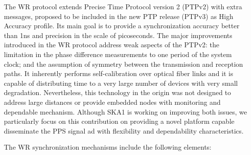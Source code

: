 The WR protocol extends Precise Time Protocol version 2 (PTPv2) with extra messages, proposed to be included in the new PTP release (PTPv3) as High Accuracy profile. Its main goal is to provide a synchronization accuracy better than 1ns and precision in the scale of picoseconds. The major improvements introduced in the WR protocol address weak aspects of the PTPv2: the limitation in the phase difference measurements to one period of the system clock; and the assumption of symmetry between the transmission and reception paths. It inherently performs self-calibration over optical fiber links and it is capable of distributing time to a very large number of devices with very small degradation. Nevertheless, this technology in the origin was not designed to address large distances or provide embedded nodes with monitoring and dependable mechanism. Although SKA1 is working on improving both issues, we particularly focus on this contribution on providing a novel platform capable disseminate the PPS signal ad with flexibility and dependability characteristics.  



The WR synchronization mechanisms include the following elements:

